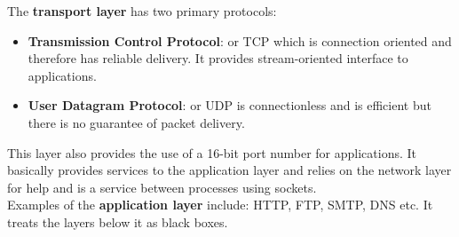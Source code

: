 \documentclass[twoside]{article}
\begin{document}
The \textbf{transport layer} has two primary protocols:
\begin{itemize}
    \item \textbf{Transmission Control Protocol}: or TCP which is connection
    oriented and therefore has reliable delivery. It provides stream-oriented
    interface to applications.
    \item \textbf{User Datagram Protocol}: or UDP is connectionless and is 
    efficient but there is no guarantee of packet delivery.
\end{itemize}
This layer also provides the use of a 16-bit port number for applications. It
basically provides services to the application layer and relies on the network
layer for help and is a service between processes using sockets.\\

Examples of the \textbf{application layer} include: HTTP, FTP, SMTP, DNS etc.
It treats the layers below it as black boxes.
\end{document}
